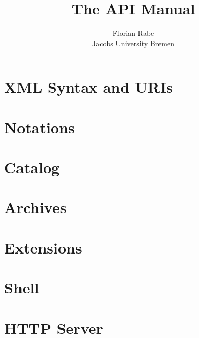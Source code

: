 \documentclass{article}
\title{The {\mmt} API Manual}
\author{Florian Rabe \\
Jacobs University Bremen}
\begin{document}
\maketitle


\section{{\mmt} XML Syntax and {\mmt} URIs}\label{sec:syntax}
  


\section{Notations}\label{sec:notations}
  

\section{Catalog}\label{sec:catalog}
  

\section{Archives}\label{sec:archives}
  

\section{Extensions}\label{sec:extensions}
  

\section{Shell}\label{sec:shell}
  

\section{HTTP Server}\label{sec:http}
  




\end{document}
